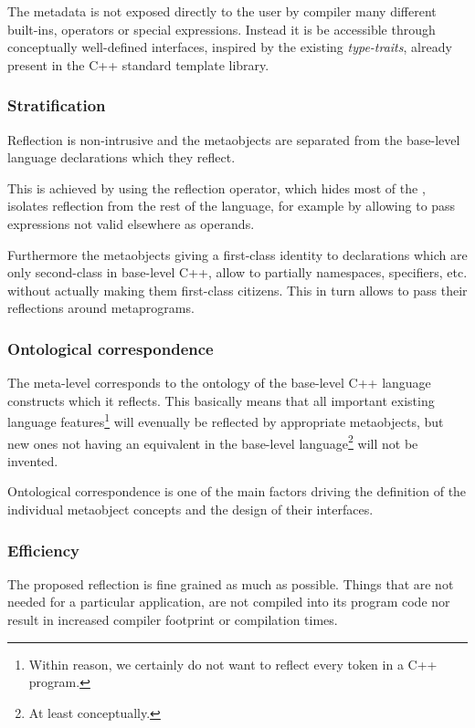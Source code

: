 The metadata is not exposed directly to the user by compiler many different
built-ins, operators or special expressions.
Instead it is be accessible through conceptually well-defined interfaces,
inspired by the existing {\em type-traits}, already present in
the C++ standard template library.

\subsubsection{Stratification}
\label{design-stratification}

Reflection is non-intrusive and the metaobjects are separated
from the base-level language declarations which they reflect.

This is achieved by using the reflection operator, which hides most of the
, isolates reflection from the rest of the language,
for example by allowing to pass expressions not valid elsewhere as operands.

Furthermore the metaobjects giving a first-class identity to declarations
which are only second-class in base-level C++,
allow to partially  namespaces, specifiers, etc. without actually
making them first-class citizens. This in turn allows to pass their reflections around
metaprograms.

\subsubsection{Ontological correspondence}
\label{design-onto-corr}

The meta-level 
corresponds to the ontology of the base-level C++ language constructs
which it reflects. This basically means that all important existing language
features\footnote{Within reason, we certainly do not want to reflect every token
in a C++ program.} will evenually be reflected by appropriate metaobjects,
but new ones not having an equivalent in the base-level language\footnote{At least
conceptually.} will not be invented.

Ontological correspondence is one of the main factors driving the definition of the
individual metaobject concepts and the design of their interfaces.


\subsubsection{Efficiency}
\label{design-efficiency}

The proposed reflection is fine grained as much as possible.
Things that are not needed for a particular application,
are not compiled into its program code nor result in
increased compiler footprint or compilation times.

